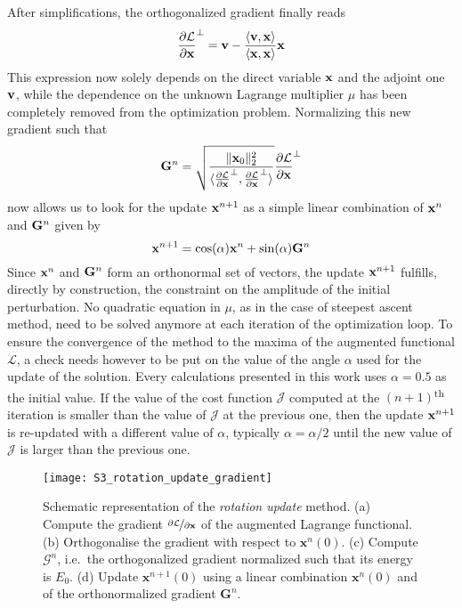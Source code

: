   After simplifications, the orthogonalized gradient finally reads
  \begin{equation}
    \frac{\partial \mathcal{L}}{\partial {\bf x}}^{\perp} = \mathbf{v} - \frac{\langle \mathbf{v},{\bf x} \rangle}{\langle {\bf x},{\bf x} \rangle}{\bf x}
    \label{eq: orthogonalised gradient}
  \end{equation}
  This expression now solely depends on the direct variable ${\bf x}$ and the adjoint one ${\bf v}$, while the dependence on the unknown Lagrange multiplier $\mu$ has been completely removed from the optimization problem. Normalizing this new gradient such that
  \begin{equation}
    {\bf G}^n = \sqrt{\frac{\| \mathbf{x}_0 \|_2^2}{\langle \frac{\partial \mathcal{L}}{\partial {\bf x}}^{\perp},\frac{\partial \mathcal{L}}{\partial {\bf x}}^{\perp} \rangle}} \frac{\partial \mathcal{L}}{\partial {\bf x}}^{\perp}
  \end{equation}
  now allows us to look for the update ${\bf x}^{n+1}$ as a simple linear combination of ${\bf x}^n$ and ${\bf G}^n$ given by
  \begin{equation}
    {\bf x}^{n+1} = \cos(\alpha) {\bf x}^n + \sin(\alpha) {\bf G}^n
  \end{equation}
  Since ${\bf x}^n$ and ${\bf G}^n$ form an orthonormal set of vectors, the update ${\bf x}^{n+1}$ fulfills, directly by construction, the constraint on the amplitude of the initial perturbation. No quadratic equation in $\mu$, as in the case of steepest ascent method, need to be solved anymore at each iteration of the optimization loop. To ensure the convergence of the method to the maxima of the augmented functional $\mathcal{L}$, a check needs however to be put on the value of the angle $\alpha$ used for the update of the solution. Every calculations presented in this work uses $\alpha=0.5$ as the initial value. If the value of the cost function $\mathcal{J}$ computed at the $(n+1)$\textsuperscript{th} iteration is smaller than the value of $\mathcal{J}$ at the previous one, then the update ${\bf x}^{n+1}$ is re-updated with a different value of $\alpha$, typically $\alpha = \alpha/2$ until the new value of $\mathcal{J}$ is larger than the previous one.

  \begin{figure}
    \centering
    \texttt{[image: S3\_rotation\_update\_gradient]}
    \caption{Schematic representation of the \emph{rotation update} method. (a) Compute the gradient $\nicefrac{\partial \mathcal{L}}{\partial \mathbf{x}}$ of the augmented Lagrange functional. (b) Orthogonalise the gradient with respect to $\mathbf{x}^n(0)$. (c) Compute $\mathcal{G}^n$, i.e.\ the orthogonalized gradient normalized such that its energy is $E_0$. (d) Update $\mathbf{x}^{n+1}(0)$ using a linear combination $\mathbf{x}^n(0)$ and of the orthonormalized gradient $\mathbf{G}^n$.}
    \label{fig: numerics -- rotation update gradient}
  \end{figure}


